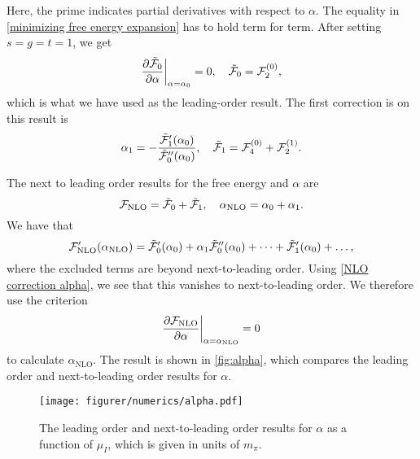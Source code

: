 %
Here, the prime indicates partial derivatives with respect to $\alpha$.
The equality in \cref{minimizing free energy expansion} has to hold term for term.
After setting $s = g = t = 1$, we get
\begin{align*}
    \diffp{\tilde \Ef_0}{\alpha}\bigg|_{\alpha=\alpha_0} = 0, \quad
    \tilde \Ef_0 = \Ef_2^{(0)},
\end{align*}
which is what we have used as the leading-order result. 
The first correction is on this result is
\begin{equation}
    \label{NLO correction alpha}
    \alpha_1 = - \frac{\tilde {\mathcal{F}}_1'(\alpha_0)}{{\tilde {\mathcal{F}}_0''(\alpha_0)}},
    \quad 
    \tilde {\mathcal{F}}_1 = \mathcal{F}_{4}^{(0)} + \mathcal{F}_{2}^{(1)}.
\end{equation}
%

The next to leading order results for the free energy and $\alpha$ are
\begin{equation}
    \mathcal{F}_\mathrm{NLO} = \tilde {\mathcal{F}}_0 + \tilde {\mathcal{F}}_1, \quad
    \alpha_\mathrm{NLO} = \alpha_0 + \alpha_1.
\end{equation}
%
We have that
\begin{equation}
    \mathcal{F}_\mathrm{NLO}'(\alpha_\mathrm{NLO})
    = \tilde {\mathcal{F}}_0'(\alpha_0) + \alpha_1 \tilde {\mathcal{F}}_0''(\alpha_0) + \dots
    + \tilde {\mathcal{F}}_1'(\alpha_0) + \dots,
\end{equation}
%
where the excluded terms are beyond next-to-leading order.
Using \cref{NLO correction alpha}, we see that this vanishes to next-to-leading order.
We therefore use the criterion
\begin{equation}
    \label{alpha nlo method 2}
    \diffp{\Ef_\mathrm{NLO}}{\alpha} \bigg|_{\alpha=\alpha_{\mathrm{NLO}}} = 0
\end{equation}
%
to calculate $\alpha_\text{NLO}$.
The result is shown in \autoref{fig:alpha}, which compares the leading order and next-to-leading order results for $\alpha$.

\begin{figure}
    \centering
    \texttt{[image: figurer/numerics/alpha.pdf]}
    \caption{The leading order and next-to-leading order results for $\alpha$ as a function of $\mu_I$, which is given in units of $m_\pi$. }
    \label{fig:alpha}
\end{figure}

